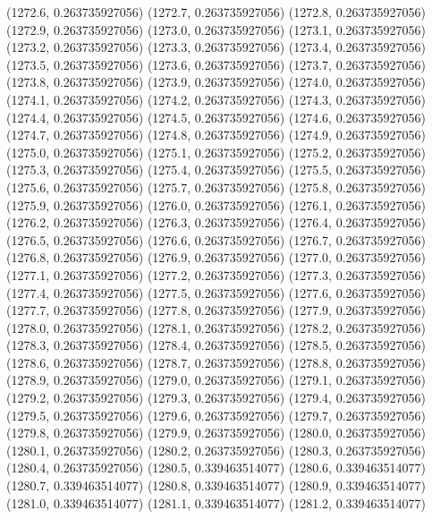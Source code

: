 {					(1272.6, 0.263735927056)
					(1272.7, 0.263735927056)
					(1272.8, 0.263735927056)
					(1272.9, 0.263735927056)
					(1273.0, 0.263735927056)
					(1273.1, 0.263735927056)
					(1273.2, 0.263735927056)
					(1273.3, 0.263735927056)
					(1273.4, 0.263735927056)
					(1273.5, 0.263735927056)
					(1273.6, 0.263735927056)
					(1273.7, 0.263735927056)
					(1273.8, 0.263735927056)
					(1273.9, 0.263735927056)
					(1274.0, 0.263735927056)
					(1274.1, 0.263735927056)
					(1274.2, 0.263735927056)
					(1274.3, 0.263735927056)
					(1274.4, 0.263735927056)
					(1274.5, 0.263735927056)
					(1274.6, 0.263735927056)
					(1274.7, 0.263735927056)
					(1274.8, 0.263735927056)
					(1274.9, 0.263735927056)
					(1275.0, 0.263735927056)
					(1275.1, 0.263735927056)
					(1275.2, 0.263735927056)
					(1275.3, 0.263735927056)
					(1275.4, 0.263735927056)
					(1275.5, 0.263735927056)
					(1275.6, 0.263735927056)
					(1275.7, 0.263735927056)
					(1275.8, 0.263735927056)
					(1275.9, 0.263735927056)
					(1276.0, 0.263735927056)
					(1276.1, 0.263735927056)
					(1276.2, 0.263735927056)
					(1276.3, 0.263735927056)
					(1276.4, 0.263735927056)
					(1276.5, 0.263735927056)
					(1276.6, 0.263735927056)
					(1276.7, 0.263735927056)
					(1276.8, 0.263735927056)
					(1276.9, 0.263735927056)
					(1277.0, 0.263735927056)
					(1277.1, 0.263735927056)
					(1277.2, 0.263735927056)
					(1277.3, 0.263735927056)
					(1277.4, 0.263735927056)
					(1277.5, 0.263735927056)
					(1277.6, 0.263735927056)
					(1277.7, 0.263735927056)
					(1277.8, 0.263735927056)
					(1277.9, 0.263735927056)
					(1278.0, 0.263735927056)
					(1278.1, 0.263735927056)
					(1278.2, 0.263735927056)
					(1278.3, 0.263735927056)
					(1278.4, 0.263735927056)
					(1278.5, 0.263735927056)
					(1278.6, 0.263735927056)
					(1278.7, 0.263735927056)
					(1278.8, 0.263735927056)
					(1278.9, 0.263735927056)
					(1279.0, 0.263735927056)
					(1279.1, 0.263735927056)
					(1279.2, 0.263735927056)
					(1279.3, 0.263735927056)
					(1279.4, 0.263735927056)
					(1279.5, 0.263735927056)
					(1279.6, 0.263735927056)
					(1279.7, 0.263735927056)
					(1279.8, 0.263735927056)
					(1279.9, 0.263735927056)
					(1280.0, 0.263735927056)
					(1280.1, 0.263735927056)
					(1280.2, 0.263735927056)
					(1280.3, 0.263735927056)
					(1280.4, 0.263735927056)
					(1280.5, 0.339463514077)
					(1280.6, 0.339463514077)
					(1280.7, 0.339463514077)
					(1280.8, 0.339463514077)
					(1280.9, 0.339463514077)
					(1281.0, 0.339463514077)
					(1281.1, 0.339463514077)
					(1281.2, 0.339463514077)
}
